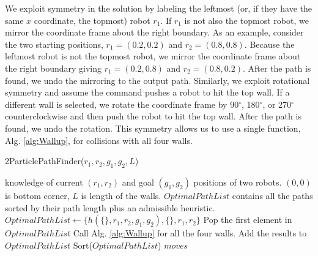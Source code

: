 We  exploit symmetry in the solution by labeling the leftmost (or, if they have the same $x$ coordinate, the topmost) robot $r_1$. 
 If $r_1$ is not also the topmost robot, we mirror the coordinate frame about the right boundary. 
 As an example, consider the two starting positions, $r_1 =  (0.2, 0.2) $ and $r_2 = (0.8, 0.8)$. 
  Because the leftmost robot is not the topmost robot, we mirror the coordinate frame about the right boundary giving $r_1 = (0.2, 0.8)$ and $r_2 = (0.8,0.2)$. 
 After the path is found, we undo the mirroring to the output path. 
  Similarly, we exploit rotational symmetry and assume the command pushes a robot to hit the top wall.
   If a different wall is selected, we rotate the coordinate frame by 90$^{\circ}$, 180$^{\circ}$, or 270$^{\circ}$ counterclockwise and then push the robot to hit the top wall.  After the path is found, we undo the rotation. 
   This symmetry allows us to use a single function, Alg. \ref{alg:Wallup},  for collisions with all four walls. 

\begin{algorithm}[htb]
\caption{2ParticlePathFinder($r_1,r_2,g_1,g_2,L$)}\label{alg:optimalAlg}
\begin{algorithmic}[1]
\Require knowledge of current $(r_1,r_2)$ and goal $(g_1,g_2)$ positions of  two robots. 
$(0,0)$ is bottom corner,
 $L$ is length of the walls. 
 $OptimalPathList$ contains all the paths sorted by their path length plus an admissible heuristic. 
 \State $OptimalPathList \gets \{ h(\{\},r_1,r_2,g_1,g_2  ) ,\{\},r_1,r_2\}$ 
\State Pop the first element in $OptimalPathList$
\State Call Alg. \ref{alg:Wallup} for all the four walls.
\State Add the results to $OptimalPathList$
\State Sort($OptimalPathList$)
\EndWhile
\State \Return $moves$
\end{algorithmic}
\end{algorithm}


